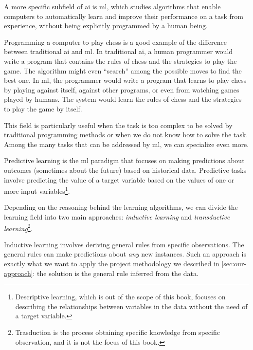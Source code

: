 A more specific subfield of \gls{ai} is \gls{ml}, which studies algorithms that
enable computers to automatically learn and improve their performance on a task from
experience, without being explicitly programmed by a human being.

Programming a computer to play chess is a good example of the difference between
traditional \gls{ai} and \gls{ml}.  In traditional \gls{ai}, a human programmer
would write a program that contains the rules of chess and the strategies to play the game.
The algorithm might even ``search'' among the possible moves to find the best one.  In
\gls{ml}, the programmer would write a program that learns to play chess by playing
against itself, against other programs, or even from watching games played by humans.
The system would learn the rules of chess and the strategies to play the game by itself.

This field is particularly useful when the task is too complex to be solved by
traditional programming methods or when we do not know how to solve the task.
Among the many tasks that can be addressed by \gls{ml}, we can specialize even more.

Predictive learning is the \gls{ml} paradigm that focuses on making predictions about
outcomes (sometimes about the future) based on historical data.  Predictive tasks
involve predicting the value of a target variable based on the values of one or more
input variables\footnote{Descriptive learning, which is out of the scope of this book,
focuses on describing the relationships between variables in the data without the
need of a target variable.}.

Depending on the reasoning behind the learning algorithms, we can divide the learning
field into two main approaches: \emph{inductive learning} and \emph{transductive
learning}\footnote{Trasduction is the process obtaining specific knowledge from specific
observation, and it is not the focus of this book.}.

Inductive learning involves deriving general rules from specific observations.  The
general rules can make predictions about \emph{any} new instances.  Such an approach
is exactly what we want to apply the project methodology we described in
\cref{sec:our-approach}:  the solution is the general rule inferred from the data.

